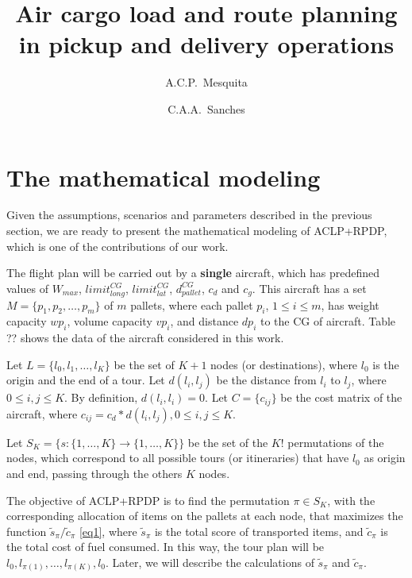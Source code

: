 \documentclass[preprint]{elsarticle}
\begin{document}
\begin{frontmatter}

\title{Air cargo load and route planning in pickup and delivery operations}

\author{A.C.P.~Mesquita}

\author{C.A.A.~Sanches}

\address {Instituto Tecnol\'{o}gico de Aeron\'{a}utica - DCTA/ITA/IEC\\
Pra\c{c}a Mal. Eduardo Gomes, 50\\
S\~{a}o Jos\'{e} dos Campos - SP - 12.228-900 - Brazil}



\end{frontmatter}



\section{The mathematical modeling}
\label{sec4}

Given the assumptions, scenarios and parameters described in the previous section, we are ready to present the mathematical modeling of ACLP+RPDP, which is one of the contributions of our work.

The flight plan will be carried out by a {\bf single} aircraft, which has predefined values of $W_{max}$, $limit^{CG}_{long}$, $limit^{CG}_{lat }$, $d^{CG}_{pallet}$, $c_d$ and $c_g$. This aircraft has a set $M = \{p_1, p_2, \ldots, p_m \}$\/ of $m$\/ pallets, where each pallet $p_i$, $1 \leq i \leq m$, has weight capacity $wp_i$, volume capacity $vp_i$, and distance $dp_i$\/ to the CG of aircraft. Table ?? shows the data of the aircraft considered in this work.

Let $L = \{ l_0, l_1, \ldots, l_K \}$ be the set of $K+1$\/ nodes (or destinations), where $l_0$\/ is the origin and the end of a tour. Let $d(l_i,l_j)$\/ be the distance from $l_i$\/ to $l_j$, where $0 \leq i,j \leq K$. By definition, $d(l_i,l_i)=0$. Let $C=\{c_{ij}\}$ be the cost matrix of the aircraft, where $c_{ij} = c_d*d(l_i,l_j), 0 \leq i,j \leq K$. 

Let $S_K = \{s: \{1, \dots, K\} \rightarrow \{1, \dots, K\} \}$\/ be the set of the $K!$\/ permutations of the nodes, which correspond to all possible tours (or itineraries) that have $l_0$\/ as origin and end, passing through the others $K$\/ nodes. 

The objective of ACLP+RPDP is to find the permutation $\pi \in S_K$, with the corresponding allocation of items on the pallets at each node, that maximizes the function $\tilde{s}_\pi/\tilde{c}_\pi$ \ref{eq1}, where $\tilde{s}_\pi$\/ is the total score of transported items, and  $\tilde{c}_\pi$\/ is the total cost of fuel consumed. In this way, the tour plan will be $l_0, l_{\pi(1)}, \ldots, l_{\pi(K)}, l_0$. Later, we will describe the calculations of $\tilde{s}_\pi$\/ and $\tilde{c}_\pi$.
\end{document}
